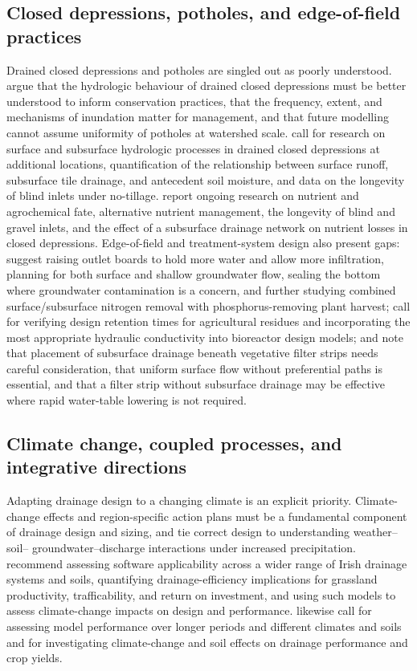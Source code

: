 \subsection{Closed depressions, potholes, and edge-of-field practices}

Drained closed depressions and potholes are singled out as poorly understood.
\textcite{Martin2019} argue that the hydrologic behaviour of drained closed
depressions must be better understood to inform conservation practices, that
the frequency, extent, and mechanisms of inundation matter for management, and
that future modelling cannot assume uniformity of potholes at watershed scale.
\textcite{Williams2020} call for research on surface and subsurface hydrologic
processes in drained closed depressions at additional locations, quantification
of the relationship between surface runoff, subsurface tile drainage, and
antecedent soil moisture, and data on the longevity of blind inlets under
no-tillage. \textcite{Feyereisen2015b} report ongoing research on nutrient and
agrochemical fate, alternative nutrient management, the longevity of blind and
gravel inlets, and the effect of a subsurface drainage network on nutrient
losses in closed depressions. Edge-of-field and treatment-system design also
present gaps: \textcite{Gordon2021} suggest raising outlet boards to hold more
water and allow more infiltration, planning for both surface and shallow
groundwater flow, sealing the bottom where groundwater contamination is a
concern, and further studying combined surface/subsurface nitrogen removal with
phosphorus-removing plant harvest; \textcite{Feyereisen2015} call for verifying
design retention times for agricultural residues and incorporating the most
appropriate hydraulic conductivity into bioreactor design models; and
\textcite{Bhattarai2009} note that placement of subsurface drainage beneath
vegetative filter strips needs careful consideration, that uniform surface flow
without preferential paths is essential, and that a filter strip without
subsurface drainage may be effective where rapid water-table lowering is not
required.

\subsection{Climate change, coupled processes, and integrative directions}

Adapting drainage design to a changing climate is an explicit priority.
Climate-change effects and region-specific action plans must be a fundamental
component of drainage design and sizing, and
\textcite{Deelstra2015} tie correct design to understanding weather--soil--
groundwater--discharge interactions under increased precipitation.
\textcite{Tuohy2018} recommend assessing software applicability across a wider
range of Irish drainage systems and soils, quantifying drainage-efficiency
implications for grassland productivity, trafficability, and return on
investment, and using such models to assess climate-change impacts on design
and performance. \textcite{Malota2024} likewise call for assessing model
performance over longer periods and different climates and soils and for
investigating climate-change and soil effects on drainage performance and crop
yields.

